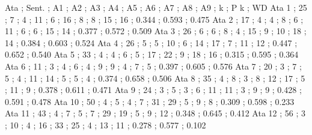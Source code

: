 Ata      ; Sent. ;  A1  ;   A2 ;  A3 ;  A4 ;   A5 ;   A6 ;   A7 ;   A8 ;   A9  ;  k      ;  P k   ;   WD
Ata 1    ; 25    ;  7   ;   4  ;  11 ;  6  ;   16 ;   8  ;   8  ;   15 ;   16  ;  0.344  ;  0.593 ;   0.475
Ata 2    ; 17    ;  4   ;   4  ;  8  ;  6  ;   11 ;   6  ;   6  ;   15 ;   14  ;  0.377  ;  0.572 ;   0.509
Ata 3    ; 26    ;  6   ;   6  ;  8  ;  4  ;   15 ;   9  ;   10 ;   18 ;   14  ;  0.384  ;  0.603 ;   0.524
Ata 4    ; 26    ;  5   ;   5  ;  10 ;  6  ;   14 ;   17 ;   7  ;   11 ;   12  ;  0.447  ;  0.652 ;   0.540
Ata 5    ; 33    ;  4   ;   4  ;  6  ;  5  ;   17 ;   22 ;   9  ;   18 ;   16  ;  0.315  ;  0.595 ;   0.364
Ata 6    ; 11    ;  3   ;   4  ;  6  ;  4  ;   9  ;   9  ;   4  ;   7  ;   5   ;  0.397  ;  0.605 ;   0.576
Ata 7    ; 20    ;  3   ;   7  ;  5  ;  4  ;   11 ;   14 ;   5  ;   5  ;   4   ;  0.374  ;  0.658 ;   0.506
Ata 8    ; 35    ;  4   ;   8  ;  3  ;  8  ;   12 ;   17 ;   5  ;   11 ;   9   ;  0.378  ;  0.611 ;   0.471
Ata 9    ; 24    ;  3   ;   5  ;  3  ;  6  ;   11 ;   11 ;   3  ;   9  ;   9   ;  0.428  ;  0.591 ;   0.478
Ata 10   ; 50    ;  4   ;   5  ;  4  ;  7  ;   31 ;   29 ;   5  ;   9  ;   8   ;  0.309  ;  0.598 ;   0.233
Ata 11   ; 43    ;  4   ;   7  ;  5  ;  7  ;   29 ;   19 ;   5  ;   9  ;   12  ;  0.348  ;  0.645 ;   0.412
Ata 12   ; 56    ;  3   ;   10 ;  4  ;  16 ;   33 ;   25 ;   4  ;   13 ;   11  ;  0.278  ;  0.577 ;   0.102








